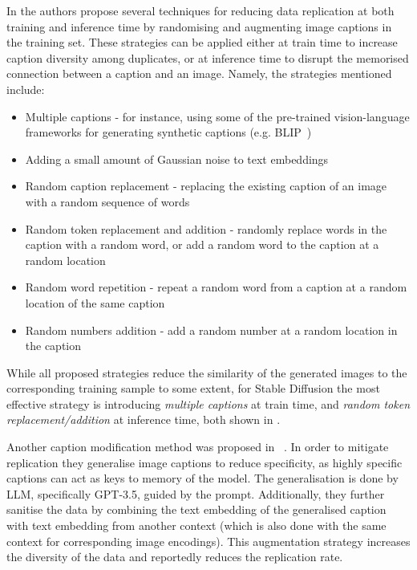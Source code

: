 \documentclass[conference]{IEEEtran}
\begin{document}
In \cite{somepalli_understanding_2023} the authors propose several techniques for reducing data replication at both training and inference time by randomising and augmenting image captions in the training set. 
These strategies can be applied either at train time to increase caption diversity among duplicates, or at inference time to disrupt the memorised connection between a caption and an image. 
Namely, the strategies mentioned include:
\begin{itemize}
    \item Multiple captions - for instance, using some of the pre-trained vision-language frameworks for generating synthetic captions (e.g. BLIP~\cite{li_blip_2022})
    \item Adding a small amount of Gaussian noise to text embeddings
    \item Random caption replacement - replacing the existing caption of an image with a random sequence of words
    \item Random token replacement and addition - randomly replace words in the caption with a random word, or add a random word to the caption at a random location
    \item Random word repetition - repeat a random word from a caption at a random location of the same caption
    \item Random numbers addition - add a random number at a random location in the caption
\end{itemize}
While all proposed strategies reduce the similarity of the generated images to the corresponding training sample to some extent, for Stable Diffusion the most effective strategy is introducing \textit{multiple captions} at train time, and \textit{random token replacement/addition} at inference time, both shown in .

Another caption modification method was proposed in ~\cite{li_mitigate_2024}. In order to mitigate replication they generalise image captions to reduce specificity, as highly specific captions can act as keys to memory of the model. The generalisation is done by LLM, specifically GPT-3.5, guided by the prompt. 
Additionally, they further sanitise the data by combining the text embedding of the generalised caption with text embedding from another context (which is also done with the same context for corresponding image encodings). This augmentation strategy increases the diversity of the data and reportedly reduces the replication rate.
\end{document}
